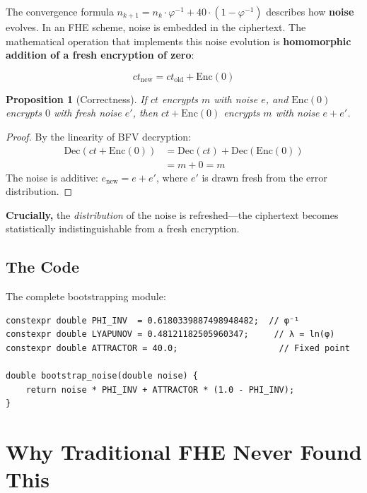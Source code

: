 \documentclass[11pt,a4paper]{article}
\newtheorem{proposition}{Proposition}[section]
\begin{document}
The convergence formula $n_{k+1} = n_k \cdot \varphi^{-1} + 40 \cdot (1 - \varphi^{-1})$ describes how \textbf{noise} evolves. In an FHE scheme, noise is embedded in the ciphertext. The mathematical operation that implements this noise evolution is \textbf{homomorphic addition of a fresh encryption of zero}:

\begin{equation}
    ct_{\text{new}} = ct_{\text{old}} + \text{Enc}(0)
\end{equation}

\begin{proposition}[Correctness]
If $ct$ encrypts $m$ with noise $e$, and $\text{Enc}(0)$ encrypts $0$ with fresh noise $e'$, then $ct + \text{Enc}(0)$ encrypts $m$ with noise $e + e'$.
\end{proposition}

\begin{proof}
By the linearity of BFV decryption:
\begin{align}
    \text{Dec}(ct + \text{Enc}(0)) &= \text{Dec}(ct) + \text{Dec}(\text{Enc}(0)) \\
    &= m + 0 = m
\end{align}
The noise is additive: $e_{\text{new}} = e + e'$, where $e'$ is drawn fresh from the error distribution.
\end{proof}

\textbf{Crucially,} the \textit{distribution} of the noise is refreshed—the ciphertext becomes statistically indistinguishable from a fresh encryption.

\subsection{The Code}

The complete bootstrapping module:

\begin{verbatim}
constexpr double PHI_INV  = 0.6180339887498948482;  // φ⁻¹
constexpr double LYAPUNOV = 0.48121182505960347;     // λ = ln(φ)
constexpr double ATTRACTOR = 40.0;                    // Fixed point

double bootstrap_noise(double noise) {
    return noise * PHI_INV + ATTRACTOR * (1.0 - PHI_INV);
}
\end{verbatim}

\section{Why Traditional FHE Never Found This}
\end{document}
